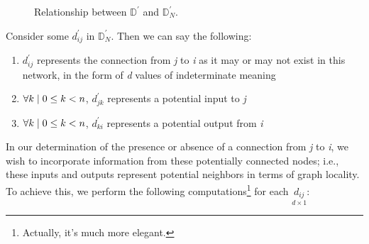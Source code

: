 \begin{figure}[H]
	\centering
	\caption{Relationship between $\mathbb{D}^{\prime}$ and 
		$\mathbb{D}^{\prime}_N$.}
	\label{fig:transform}
\end{figure}\noindent
Consider some $d_{ij}^{\prime}$ in $\mathbb{D}^{\prime}_N$. Then we can say the 
following:
\begin{enumerate}
	\item $d_{ij}^{\prime}$ represents the connection from \textit{j} to 
		\textit{i} as it may or may not exist in this network, in the form of 
		\textit{d} values of indeterminate meaning
	\item $\mathlarger\forall k \mid 0 \leq k < n$, $d_{jk}^{\prime}$ represents 
		a potential input to \textit{j}
	\item $\mathlarger\forall k \mid 0 \leq k < n$, $d_{ki}^{\prime}$ represents 
		a potential output from \textit{i}
\end{enumerate}
In our determination of the presence or absence of a connection from \textit{j} 
to \textit{i}, we wish to incorporate information from these potentially 
connected nodes; i.e., these inputs and outputs represent potential neighbors in 
terms of graph locality. To achieve this, we perform the following 
computations\footnote{Actually, it's much more elegant.} for each $\underset{d 
\times 1}{d_{ij}}$:
